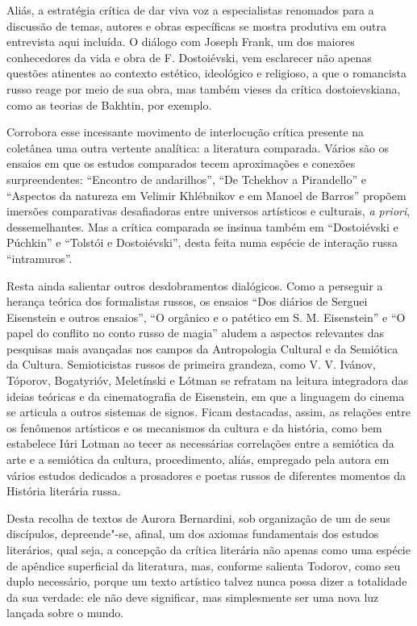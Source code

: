 Aliás, a estratégia crítica de dar viva voz a especialistas renomados
para a discussão de temas, autores e obras específicas se mostra
produtiva em outra entrevista aqui incluída. O diálogo com Joseph Frank,
um dos maiores conhecedores da vida e obra de F. Dostoiévski, vem
esclarecer não apenas questões atinentes ao contexto estético,
ideológico e religioso, a que o romancista russo reage por meio de sua
obra, mas também vieses da crítica dostoievskiana, como as teorias de
Bakhtin, por exemplo.

Corrobora esse incessante movimento de interlocução crítica presente na
coletânea uma outra vertente analítica: a literatura comparada. Vários
são os ensaios em que os estudos comparados tecem aproximações e
conexões surpreendentes: ``Encontro de andarilhos'', ``De Tchekhov a
Pirandello'' e ``Aspectos da natureza em Velimir Khlébnikov e em Manoel
de Barros'' propõem imersões comparativas desafiadoras entre universos
artísticos e culturais, \emph{a priori}, dessemelhantes. Mas a crítica
comparada se insinua também em ``Dostoiévski e Púchkin'' e ``Tolstói e
Dostoiévski'', desta feita numa espécie de interação russa
``intramuros''.

Resta ainda salientar outros desdobramentos dialógicos. Como a perseguir
a herança teórica dos formalistas russos, os ensaios ``Dos diários de
Serguei Eisenstein e outros ensaios'', ``O orgânico e o patético em S. M.
Eisenstein'' e ``O papel do conflito no conto russo de magia'' aludem a
aspectos relevantes das pesquisas mais avançadas nos campos da
Antropologia Cultural e da Semiótica da Cultura. Semioticistas russos de
primeira grandeza, como V. V. Ivánov, Tóporov, Bogatyrióv, Meletínski e
Lótman se refratam na leitura integradora das ideias teóricas e da
cinematografia de Eisenstein, em que a linguagem do cinema se articula a
outros sistemas de signos. Ficam destacadas, assim, as relações entre os
fenômenos artísticos e os mecanismos da cultura e da história, como bem
estabelece Iúri Lotman ao tecer as necessárias correlações entre a
semiótica da arte e a semiótica da cultura, procedimento, aliás,
empregado pela autora em vários estudos dedicados a prosadores e poetas
russos de diferentes momentos da História literária russa.

Desta recolha de textos de Aurora Bernardini, sob organização de um de
seus discípulos, depreende"-se, afinal, um dos axiomas fundamentais dos
estudos literários, qual seja, a concepção da crítica literária não
apenas como uma espécie de apêndice superficial da literatura, mas,
conforme salienta Todorov, como seu duplo necessário, porque um texto
artístico talvez nunca possa dizer a totalidade da sua verdade: ele não
deve significar, mas simplesmente ser uma nova luz lançada sobre o
mundo.


